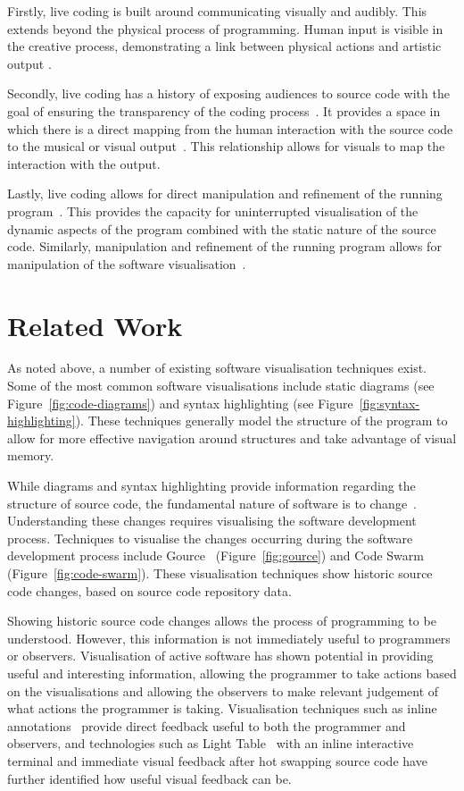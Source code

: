 Firstly, live coding is built around communicating visually and audibly. This extends beyond the physical process of programming. Human input is visible in the creative process, demonstrating a link between physical actions and artistic output \cite{Mclean}.

Secondly, live coding has a history of exposing audiences to source code with the goal of ensuring the transparency of the coding process~\cite{Collins2011,McLean2010a}. It provides a space in which there is a direct mapping from the human interaction with the source code to the musical or visual output~\cite{Mclean}. This relationship allows for visuals to map the interaction with the output.

Lastly, live coding allows for direct manipulation and refinement of the running program~\cite{Swift2013}. This provides the capacity for uninterrupted visualisation of the dynamic aspects of the program combined with the static nature of the source code. Similarly, manipulation and refinement of the running program allows for manipulation of the software visualisation~\cite{McLean2010a}.

\section{Related Work}

  

As noted above, a number of existing software visualisation techniques exist. Some of the most common software visualisations include static diagrams (see Figure~\ref{fig:code-diagrams}) and syntax highlighting (see Figure~\ref{fig:syntax-highlighting}). These techniques generally model the structure of the program to allow for more effective navigation around structures and take advantage of visual memory.

While diagrams and syntax highlighting provide information regarding the structure of source code, the fundamental nature of software is to change~\cite{Brooks1995}. Understanding these changes requires visualising the software development process. Techniques to visualise the changes occurring during the software development process include Gource~\cite{Caudwell2010} (Figure~\ref{fig:gource}) and Code Swarm~\cite{Ogawa2012} (Figure~\ref{fig:code-swarm}). These visualisation techniques show historic source code changes, based on source code repository data.

Showing historic source code changes allows the process of programming to be understood. However, this information is not immediately useful to programmers or observers. Visualisation of active software has shown potential in providing useful and interesting information, allowing the programmer to take actions based on the visualisations and allowing the observers to make relevant judgement of what actions the programmer is taking. Visualisation techniques such as inline annotations~\cite{Swift2013,Beck2013} provide direct feedback useful to both the programmer and observers, and technologies such as Light Table~\cite{Kodowa2014} with an inline interactive terminal and immediate visual feedback after hot swapping source code have further identified how useful visual feedback can be.

